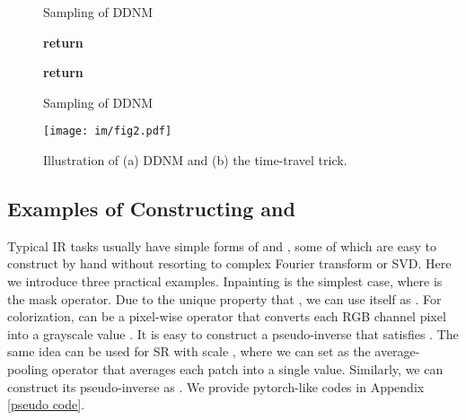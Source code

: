 \documentclass{article} \usepackage{iclr2023_conference,times}
\begin{document}
\begin{figure}
\begin{minipage}{.39\textwidth}
    \vspace{-0.5cm}
    \begin{algorithm}[H]
    \scriptsize
    \caption{Sampling of DDNM}
    \label{alg:ndm}
    \begin{algorithmic}[1]
        \State 
        \For{}
            \item[]
            \item[]
            \item[]
            \State 
            \State 
            \State 
        \EndFor
        \State \textbf{return} 
    \end{algorithmic}
    \end{algorithm}
\end{minipage}
\begin{minipage}{.59\textwidth}
    \vspace{-0.5cm}
        \begin{algorithm}[H]
        \scriptsize
        \caption{Sampling of DDNM\textcolor{blue}{}}
        \label{alg:ndm+}
        \begin{algorithmic}[1] \State 
            \For{}
                    \State 
                    \State 
                    \For{}
\State 
                        \State 
                        \State
                \EndFor
            \EndFor
        \State \textbf{return} 
        \end{algorithmic}
        \end{algorithm}
\end{minipage}
\vspace{-0.5em}
\end{figure}


\begin{figure*}[t]
  \centering
  \texttt{[image: im/fig2.pdf]}
  \vspace{-0.5cm}
  \caption{Illustration of (a) DDNM and (b) the time-travel trick.}
  \vspace{-0.5cm}
\label{fig:ddcm} 
\end{figure*}

\subsection{Examples of Constructing  and }
\label{cp:construct A}
Typical IR tasks usually have simple forms of  and , 
some of which are easy to construct by hand without resorting to complex Fourier transform or SVD. Here we introduce three practical examples. Inpainting is the simplest case, where  is the mask operator. Due to the unique property that , we can use  itself as . For colorization,  can be a pixel-wise operator  that converts each RGB channel pixel  into a grayscale value . It is easy to construct a pseudo-inverse  that satisfies . The same idea can be used for SR with scale , where we can set  as the average-pooling operator  that averages each patch into a single value. Similarly, we can construct its pseudo-inverse as . We provide pytorch-like codes in Appendix \ref{pseudo code}. 
\end{document}
